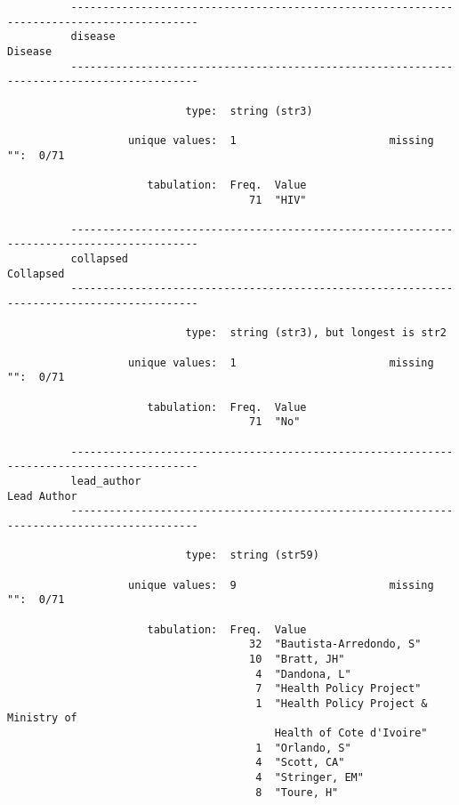 \documentclass{article}
\begin{document}
\begin{verbatim}
          
          
          
          ------------------------------------------------------------------------------------------
          disease                                                                            Disease
          ------------------------------------------------------------------------------------------
          
                            type:  string (str3)
          
                   unique values:  1                        missing "":  0/71
          
                      tabulation:  Freq.  Value
                                      71  "HIV"
          
          ------------------------------------------------------------------------------------------
          collapsed                                                                        Collapsed
          ------------------------------------------------------------------------------------------
          
                            type:  string (str3), but longest is str2
          
                   unique values:  1                        missing "":  0/71
          
                      tabulation:  Freq.  Value
                                      71  "No"
          
          ------------------------------------------------------------------------------------------
          lead_author                                                                    Lead Author
          ------------------------------------------------------------------------------------------
          
                            type:  string (str59)
          
                   unique values:  9                        missing "":  0/71
          
                      tabulation:  Freq.  Value
                                      32  "Bautista-Arredondo, S"
                                      10  "Bratt, JH"
                                       4  "Dandona, L"
                                       7  "Health Policy Project"
                                       1  "Health Policy Project & Ministry of
                                          Health of Cote d'Ivoire"
                                       1  "Orlando, S"
                                       4  "Scott, CA"
                                       4  "Stringer, EM"
                                       8  "Toure, H"
          

\end{verbatim}
\end{document}
